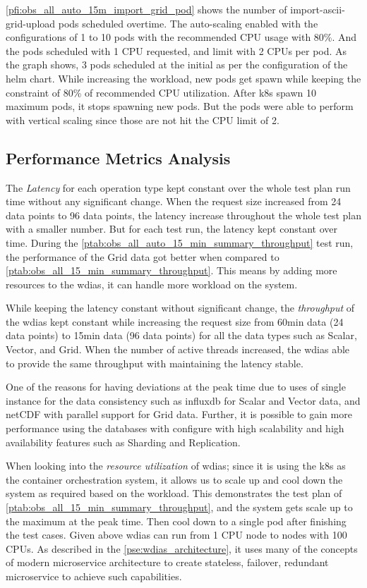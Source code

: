 \documentclass[conference]{IEEEtran}
\begin{document}
\cref{pfi:obs_all_auto_15m_import_grid_pod} shows the number of import-ascii-grid-upload pods scheduled overtime. The auto-scaling enabled with the configurations of 1 to 10 pods with the recommended CPU usage with 80\%. And the pods scheduled with 1 CPU requested, and limit with 2 CPUs per pod.
As the graph shows, 3 pods scheduled at the initial as per the configuration of the helm chart. While increasing the workload, new pods get spawn while keeping the constraint of 80\% of recommended CPU utilization. After \acrshort{k8s} spawn 10 maximum pods, it stops spawning new pods. But the pods were able to perform with vertical scaling since those are not hit the CPU limit of 2.

\subsection{Performance Metrics Analysis}
\label{psubse:performance_metrics}

The \emph{Latency} for each operation type kept constant over the whole test plan run time without any significant change. When the request size increased from 24 data points to 96 data points, the latency increase throughout the whole test plan with a smaller number. But for each test run, the latency kept constant over time.
During the \cref{ptab:obs_all_auto_15_min_summary_throughput} test run, the performance of the Grid data got better when compared to \cref{ptab:obs_all_15_min_summary_throughput}. This means by adding more resources to the \acrshort{wdias}, it can handle more workload on the system.

While keeping the latency constant without significant change, the \emph{throughput} of the \acrshort{wdias} kept constant while increasing the request size from 60min data (24 data points) to 15min data (96 data points) for all the data types such as Scalar, Vector, and Grid.
When the number of active threads increased, the \acrshort{wdias} able to provide the same throughput with maintaining the latency stable.

One of the reasons for having deviations at the peak time due to uses of single instance for the data consistency such as \acrshort{influxdb} for Scalar and Vector data, and netCDF with parallel support for Grid data. Further, it is possible to gain more performance using the databases with configure with high scalability and high availability features such as Sharding and Replication.

When looking into the \emph{resource utilization} of \acrshort{wdias}; since it is using the \acrshort{k8s} as the container orchestration system, it allows us to scale up and cool down the system as required based on the workload. This demonstrates the test plan of \cref{ptab:obs_all_15_min_summary_throughput}, and the system gets scale up to the maximum at the peak time. Then cool down to a single pod after finishing the test cases.
Given above \acrshort{wdias} can run from 1 CPU node to nodes with 100 CPUs. As described in the \cref{pse:wdias_architecture}, it uses many of the concepts of modern microservice architecture to create stateless, failover, redundant microservice to achieve such capabilities.
\end{document}
